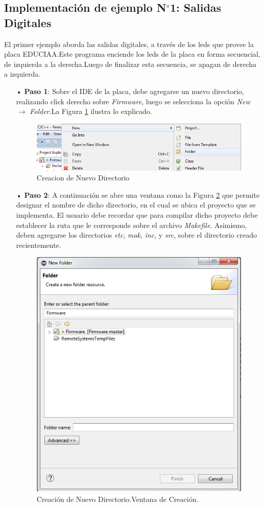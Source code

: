 \documentclass[12pt,letterpaper]{article}
\begin{document}
\subsection{Implementación de ejemplo N$^{\circ}$1: Salidas Digitales}\label{sec:ej1sapi}
El primer ejemplo aborda las salidas digitales, a través de los leds que provee la placa EDUCIAA.Este programa enciende los leds de la placa en forma secuencial, de izquierda a la derecha.Luego de finalizar esta secuencia, se apagan de derecha a izquierda.
\begin{enumerate}
\item[•]\textbf{Paso 1}: Sobre el IDE de la placa, debe agregarse un nuevo directorio, realizando click derecho sobre \textit{Firmware}, luego se selecciona la opción \textit{New} $\rightarrow$ \textit{Folder}.La Figura \ref{nuevodirectorio} ilustra lo explicado.
\begin{figure}[H]
\centering
\includegraphics[width=8 cm]{figuras/f43.png}
\caption{Creacion de Nuevo Directorio}
\label{nuevodirectorio}
\end{figure}
\item[•]\textbf{Paso 2}: A continuación se abre una ventana como la Figura \ref{nuevodirectorio2} que permite designar el nombre de dicho directorio, en el cual se ubica el proyecto que se implementa. El usuario debe recordar que para compilar dicho proyecto debe establecer la ruta que le corresponde sobre el archivo \textit{Makefile}. Asimismo, deben agregarse los directorios \textit{etc}, \textit{mak}, \textit{inc}, y \textit{src}, sobre el directorio creado recientemente.
\begin{figure}[H]
\centering
\includegraphics[width=8 cm]{figuras/f44.png}
\caption{Creación de Nuevo Directorio.Ventana de Creación.}
\label{nuevodirectorio2}
\end{figure}


\end{enumerate}
\end{document}

